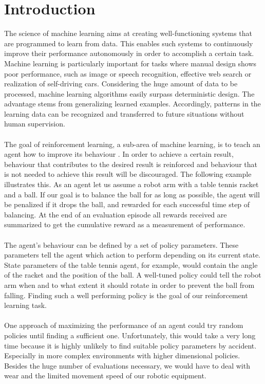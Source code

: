 \chapter{Introduction}
\label{chap:0}

The science of machine learning aims at creating well-functioning systems that are programmed to learn from data. This enables such systems to continuously improve their performance autonomously in order to accomplish a certain task. Machine learning is particularly important for tasks where manual design shows poor performance, such as image or speech recognition, effective web search or realization of self-driving cars. Considering the huge amount of data to be processed, machine learning algorithms easily surpass deterministic design. The advantage stems from generalizing learned examples. Accordingly, patterns in the learning data can be recognized and transferred to future situations without human supervision.\\
\\
The goal of reinforcement learning, a sub-area of machine learning, is to teach an agent how to improve its behaviour \cite{sutton1998reinforcement}. In order to achieve a certain result, behaviour that contributes to the desired result is reinforced and behaviour that is not needed to achieve this result will be discouraged. The following example illustrates this. As an agent let us assume a robot arm with a table tennis racket and a ball. If our goal is to balance the ball for as long as possible, the agent will be penalized if it drops the ball, and rewarded for each successful time step of balancing. At the end of an evaluation episode all
rewards received are summarized to get the cumulative reward as a measurement of performance.\\
\\
The agent's behaviour can be defined by a set of policy parameters. These parameters tell the agent which action to perform depending on its current state. State parameters of the table tennis agent, for example, would contain the angle of the racket and the position of the ball. A well-tuned policy could tell the robot arm when and to what extent it should rotate in order to prevent the ball from falling. Finding such a well performing policy is the goal of our reinforcement learning task.\\
\\
One approach of maximizing the performance of an agent could try random policies until finding a sufficient one. Unfortunately, this would take a very long time because it is highly unlikely to find suitable policy parameters by accident. Especially in more complex environments with higher dimensional policies. Besides the huge number of evaluations necessary, we would have to deal with wear and the limited movement speed of our robotic equipment.\\

